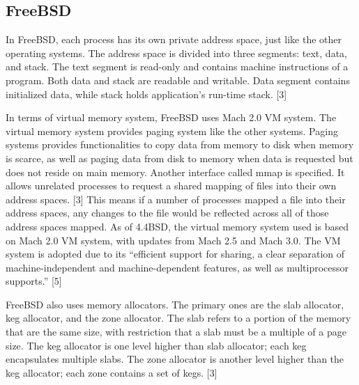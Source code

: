 \documentclass[10pt,a4paper]{article}
\begin{document}
\subsection{FreeBSD}
In FreeBSD, each process has its own private address space, just like the other operating systems. The address space is divided into three segments: text, data, and stack. The text segment is read-only and contains machine instructions of a program. Both data and stack are readable and writable. Data segment contains initialized data, while stack holds application’s run-time stack. [3]

In terms of virtual memory system, FreeBSD uses Mach 2.0 VM system. The virtual memory system provides paging system like the other systems. Paging systems provides functionalities to copy data from memory to disk when memory is scarce, as well as paging data from disk to memory when data is requested but does not reside on main memory. Another interface called mmap is specified. It allows unrelated processes to request a shared mapping of files into their own address spaces. [3] This means if a number of processes mapped a file into their address spaces, any changes to the file would be reflected across all of those address spaces mapped. As of 4.4BSD, the virtual memory system used is based on Mach 2.0 VM system, with updates from Mach 2.5 and Mach 3.0. The VM system is adopted due to its “efficient support for sharing, a clear separation of machine-independent and machine-dependent features, as well as multiprocessor supports.” [5]

FreeBSD also uses memory allocators. The primary ones are the slab allocator, keg allocator, and the zone allocator. The slab refers to a portion of the memory that are the same size, with restriction that a slab must be a multiple of a page size. The keg allocator is one level higher than slab allocator; each keg encapsulates multiple slabs. The zone allocator is another level higher than the keg allocator; each zone contains a set of kegs. [3]
\end{document}
